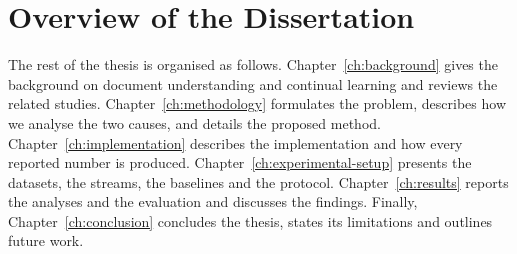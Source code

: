 \section{Overview of the Dissertation}
\label{sec:c1-s5}

The rest of the thesis is organised as follows. Chapter~\ref{ch:background} gives the
background on document understanding and continual learning and reviews the related
studies. Chapter~\ref{ch:methodology} formulates the problem, describes how we analyse the
two causes, and details the proposed method. Chapter~\ref{ch:implementation} describes the
implementation and how every reported number is produced.
Chapter~\ref{ch:experimental-setup} presents the datasets, the streams, the baselines and
the protocol. Chapter~\ref{ch:results} reports the analyses and the evaluation and
discusses the findings. Finally, Chapter~\ref{ch:conclusion} concludes the thesis, states
its limitations and outlines future work.
